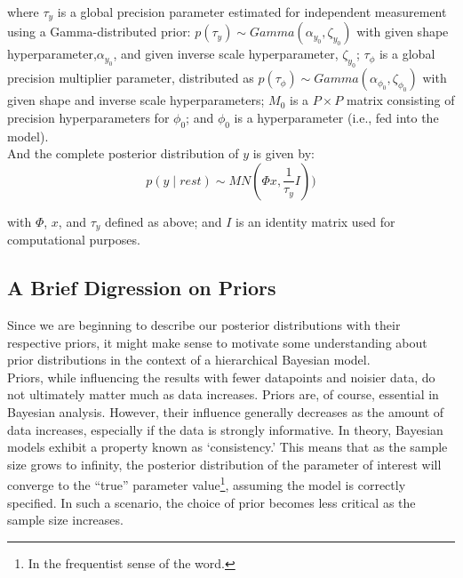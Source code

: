 \documentclass[11pt]{article}
\begin{document}
where $\tau_y$ is a global precision parameter estimated for independent measurement using a Gamma-distributed prior: $p( \tau_y ) \sim Gamma \left( \alpha_{y_0}, \zeta_{y_0} \right)$ with given shape hyperparameter,$\alpha_{y_0}$, and given inverse scale hyperparameter, $\zeta_{y_0}$;  $\tau_\phi$ is a global precision multiplier parameter, distributed as $p( \tau_\phi ) \sim Gamma \left(\alpha_{\phi_0}, \zeta_{\phi_0} \right)$ with given shape and inverse scale hyperparameters; $M_0$ is a $P \times P$ matrix consisting of precision hyperparameters for $\phi_0$; and $\phi_0$ is a hyperparameter (i.e., fed into the model). \\

And the complete posterior distribution of $y$ is given by:
\begin{equation}
\label{eq:y_dist}
	p \left( y \mid rest \right) \sim MN \left( \Phi x,\frac{1}{\tau_{y}}I\right))
\end{equation}

with $\Phi$, $x$, and $\tau_y$ defined as above; and $I$ is an identity matrix used for computational purposes.

\subsection{A Brief Digression on Priors}
Since we are beginning to describe our posterior distributions with their respective priors, it might make sense to motivate some understanding about prior distributions in the context of a hierarchical Bayesian model. \\

Priors, while influencing the results with fewer datapoints and noisier data, do not ultimately matter much as data increases. Priors are, of course, essential in Bayesian analysis. However, their influence generally decreases as the amount of data increases, especially if the data is strongly informative. In theory, Bayesian models exhibit a property known as `consistency.' This means that as the sample size grows to infinity, the posterior distribution of the parameter of interest will converge to the ``true'' parameter value\footnote{In the frequentist sense of the word.}, assuming the model is correctly specified. In such a scenario, the choice of prior becomes less critical as the sample size increases. \\
\end{document}

